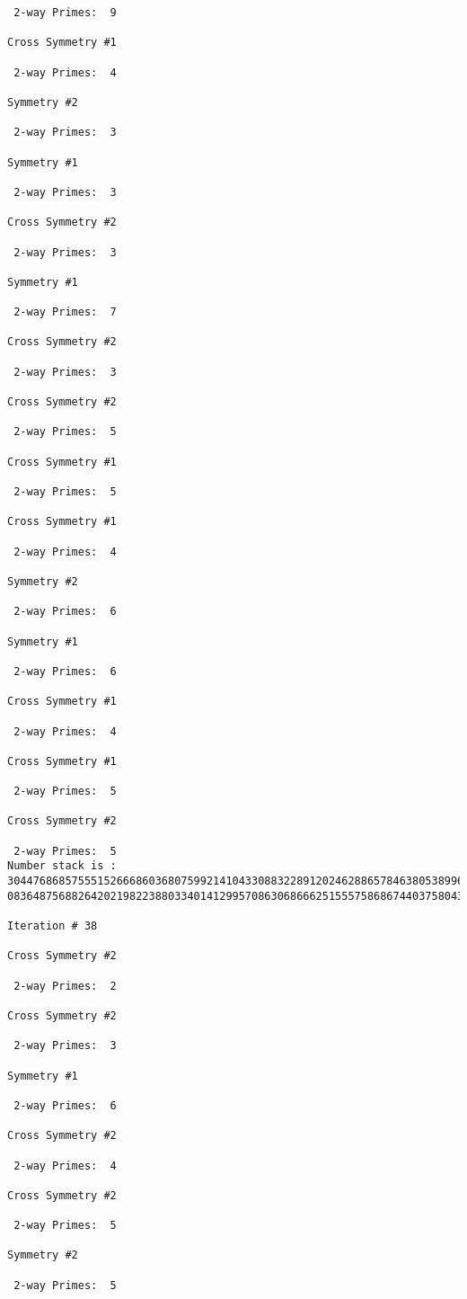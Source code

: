 \begin{verbatim}
 2-way Primes: 	9

Cross Symmetry #1

 2-way Primes: 	4

Symmetry #2

 2-way Primes: 	3

Symmetry #1

 2-way Primes: 	3

Cross Symmetry #2

 2-way Primes: 	3

Symmetry #1

 2-way Primes: 	7

Cross Symmetry #2

 2-way Primes: 	3

Cross Symmetry #2

 2-way Primes: 	5

Cross Symmetry #1

 2-way Primes: 	5

Cross Symmetry #1

 2-way Primes: 	4

Symmetry #2

 2-way Primes: 	6

Symmetry #1

 2-way Primes: 	6

Cross Symmetry #1

 2-way Primes: 	4

Cross Symmetry #1

 2-way Primes: 	5

Cross Symmetry #2

 2-way Primes: 	5
Number stack is :
30447686857555152666860368075992141043308832289120246288657846380538996794608835958544046240163340857
08364875688264202198223880334014129957086306866625155575868674403758043361042640445859538806497699835

Iteration #	38

Cross Symmetry #2

 2-way Primes: 	2

Cross Symmetry #2

 2-way Primes: 	3

Symmetry #1

 2-way Primes: 	6

Cross Symmetry #2

 2-way Primes: 	4

Cross Symmetry #2

 2-way Primes: 	5

Symmetry #2

 2-way Primes: 	5


\end{verbatim}
